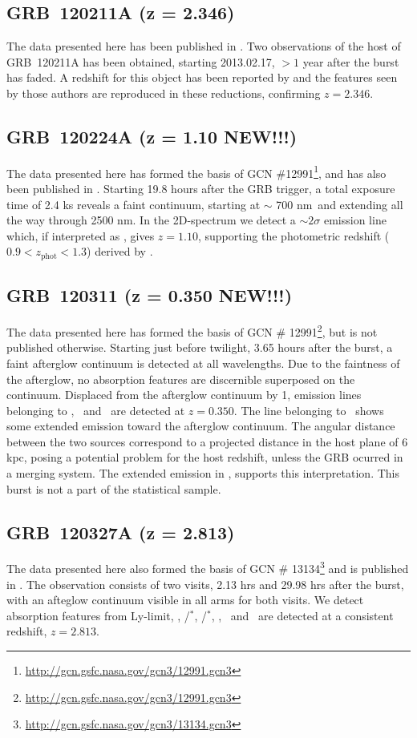 \documentclass{aa}    %
\begin{document}
\subsection{GRB~120211A (z = 2.346)}
The data presented here has been published in \citet{Kruhler2015}. Two
observations of the host of GRB~120211A has been obtained, starting 2013.02.17,
$> 1$ year after the burst has faded. A redshift for this object has been
reported by \citet{Kruhler2015} and the features seen by those authors are
reproduced in these reductions, confirming $z =	2.346$.

\subsection{GRB~120224A (z = 1.10 NEW!!!)} 

The data presented here has formed the basis of GCN
\#12991\footnote{\url{http://gcn.gsfc.nasa.gov/gcn3/12991.gcn3}}, and has also
been published in \citet{Kruhler2015}. Starting 19.8 hours after the GRB
trigger, a total exposure time of 2.4 ks reveals a faint continuum, starting at
$\sim$ 700 nm~and extending all the way through 2500 nm. In the 2D-spectrum we
detect a $\sim 2 \sigma$ emission line which, if interpreted as \ha, gives $z =
1.10$, supporting the photometric redshift ($0.9 < z_\mathrm{phot} < 1.3$)
derived by \citet{Kruhler2015}.

\subsection{GRB~120311 (z = 0.350 NEW!!!)}
The data presented here has formed the basis of GCN \#
12991\footnote{\url{http://gcn.gsfc.nasa.gov/gcn3/12991.gcn3}}, but is not
published otherwise. Starting just before twilight, 3.65 hours after the burst,
a faint afterglow continuum is detected at all wavelengths. Due to the
faintness of the afterglow, no absorption features are discernible superposed
on the continuum. Displaced from the afterglow continuum by 1, emission
lines belonging to \hb, \oiii~and \ha~are detected at $z = 0.350$. The line
belonging to \ha~shows some extended emission toward the afterglow continuum.
The angular distance between the two sources correspond to a projected distance
in the host plane of 6 kpc, posing a potential problem for the host redshift,
unless the GRB ocurred in a merging system. The extended emission in \ha,
supports this interpretation. This burst is not a part of the statistical sample.

\subsection{GRB~120327A (z = 2.813)}
The data presented here also formed the basis of GCN \#
13134\footnote{\url{http://gcn.gsfc.nasa.gov/gcn3/13134.gcn3}} and is published
in \citet{DElia2014}. The observation consists of two visits, 2.13 hrs and
29.98 hrs after the burst, with an afteglow continuum visible in all arms for
both visits. We detect absorption features from Ly-limit, \lya, \cii/\cii$^*$,
\SIii/\SIii$^*$, \ali, \feii ~and \mgii ~are detected at a consistent redshift,
$z = 2.813$.
\end{document}
